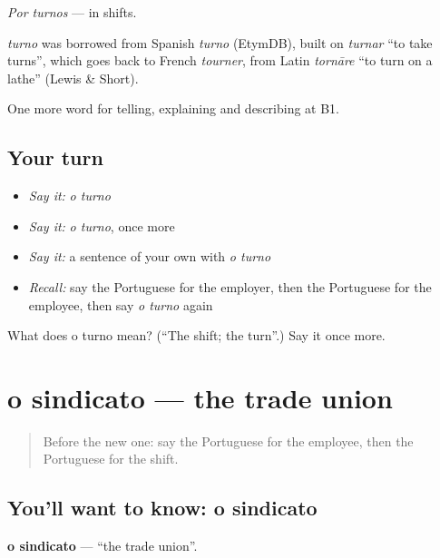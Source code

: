 \emph{Por turnos} — in shifts.

\begin{cousinweb}
\emph{turno} was borrowed from Spanish \emph{turno} (EtymDB), built on \emph{turnar} \textquotedblleft{}to take turns\textquotedblright{}, which goes back to French \emph{tourner}, from Latin \emph{tornāre} \textquotedblleft{}to turn on a lathe\textquotedblright{} (Lewis \& Short).
\end{cousinweb}

\begin{grammarlens}[title={What you've built}]
One more word for telling, explaining and describing at B1.
\end{grammarlens}

\subsection*{Your turn}
\begin{itemize}
\raggedright
  \item \emph{Say it:} \emph{o turno}
  \item \emph{Say it:} \emph{o turno}, once more
  \item \emph{Say it:} a sentence of your own with \emph{o turno}
  \item \emph{Recall:} say the Portuguese for the employer, then the Portuguese for the employee, then say \emph{o turno} again
\end{itemize}

\begin{tcolorbox}[breakable,colback=teal!4,colframe=teal!35!black,title={Before you move on}]
What does o turno mean? (\textquotedblleft{}The shift; the turn\textquotedblright{}.) Say it once more.
\end{tcolorbox}
\section[o sindicato]{o sindicato — the trade union}

\label{lesson:PT-C358-sindicato}



\begin{quote}
Before the new one: say the Portuguese for the employee, then the Portuguese for the shift.
\end{quote}

\subsection*{You'll want to know: o sindicato}
\textbf{o sindicato} — \textquotedblleft{}the trade union\textquotedblright{}.

